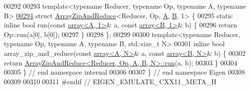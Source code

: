 \begin{DoxyCode}
00292 
00293 \textcolor{keyword}{template}<\textcolor{keyword}{typename} Reducer, \textcolor{keyword}{typename} Op, \textcolor{keyword}{typename} A, \textcolor{keyword}{typename} B>
\hyperlink{struct_eigen_1_1internal_1_1_array_zip_and_reduce_3_01_reducer_00_01_op_00_01_a_00_01_b_00_011_01_4}{00294} \textcolor{keyword}{struct }\hyperlink{struct_eigen_1_1internal_1_1_array_zip_and_reduce}{ArrayZipAndReduce}<Reducer, Op, \hyperlink{group___core___module_class_eigen_1_1_matrix}{A}, \hyperlink{group___core___module_class_eigen_1_1_matrix}{B}, 1> \{
00295   \textcolor{keyword}{static} \textcolor{keyword}{inline} \textcolor{keywordtype}{bool} run(\textcolor{keyword}{const} \hyperlink{class_eigen_1_1array}{array<A, 1>}& a, \textcolor{keyword}{const} \hyperlink{class_eigen_1_1array}{array<B, 1>}& b) \{
00296     \textcolor{keywordflow}{return} Op::run(a[0], b[0]);
00297   \}
00298 \};
00299 
00300 \textcolor{keyword}{template}<\textcolor{keyword}{typename} Reducer, \textcolor{keyword}{typename} Op, \textcolor{keyword}{typename} A, \textcolor{keyword}{typename} B, std::\textcolor{keywordtype}{size\_t} N>
00301 \textcolor{keyword}{inline} \textcolor{keywordtype}{bool} array\_zip\_and\_reduce(\textcolor{keyword}{const} \hyperlink{class_eigen_1_1array}{array<A, N>}& a, \textcolor{keyword}{const} 
      \hyperlink{class_eigen_1_1array}{array<B, N>}& b) \{
00302   \textcolor{keywordflow}{return} \hyperlink{struct_eigen_1_1internal_1_1_array_zip_and_reduce}{ArrayZipAndReduce<Reducer, Op, A, B, N>::run}(a, b);
00303 \}
00304 
00305 \}  \textcolor{comment}{// end namespace internal}
00306 
00307 \}  \textcolor{comment}{// end namespace Eigen}
00308 
00309 
00310 
00311 \textcolor{preprocessor}{#endif  // EIGEN\_EMULATE\_CXX11\_META\_H}
\end{DoxyCode}
